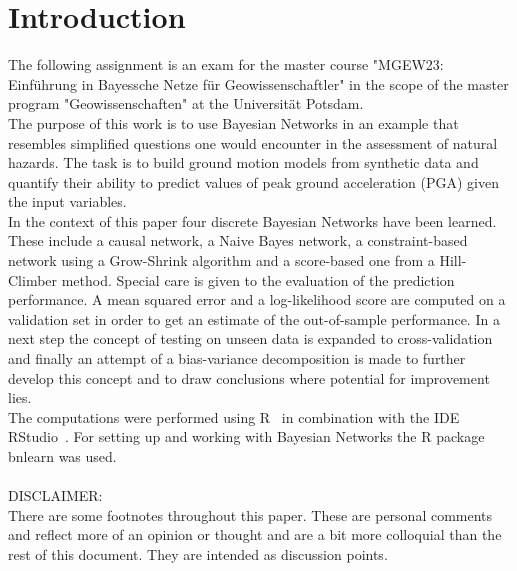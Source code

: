 
\chapter{Introduction} %

\label{Chapter1} %

The following assignment is an exam for the master course "MGEW23: Einführung in Bayessche Netze für Geowissenschaftler" in the scope of the master program "Geowissenschaften" at the Universität Potsdam.\\
The purpose of this work is to use Bayesian Networks in an example that resembles simplified questions one would encounter in the assessment of natural hazards. The task is to build ground motion models from synthetic data and quantify their ability to predict values of peak ground acceleration (PGA) given the input variables.\\
In the context of this paper four discrete Bayesian Networks have been learned. These include a causal network, a Naive Bayes network, a constraint-based network using a Grow-Shrink algorithm and a score-based one from a Hill-Climber method. Special care is given to the evaluation of the prediction performance. A mean squared error and a log-likelihood score are computed on a validation set in order to get an estimate of the out-of-sample performance. In a next step the concept of testing on unseen data is expanded to cross-validation and finally an attempt of a bias-variance decomposition is made to further develop this concept and to draw conclusions where potential for improvement lies.\\
The computations were performed using R~\citep{R} in combination with the IDE RStudio~\citep{Rstudio}. For setting up and working with Bayesian Networks the R package bnlearn \citep{bnlearn} was used. \\\\
DISCLAIMER:\\
There are some footnotes throughout this paper. These are personal comments and reflect more of an opinion or thought and are a bit more colloquial than the rest of this document. They are intended as discussion points.